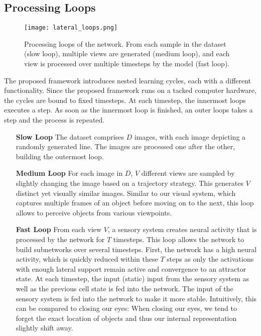 \subsection{Processing Loops}
\begin{figure}[h]
    \centering
    \texttt{[image: lateral\_loops.png]}
    \caption[Processing loops of the network]{Processing loops of the network. From each sample in the dataset (slow loop), multiple views are generated (medium loop), and each view is processed over multiple timesteps by the model (fast loop).}
\end{figure}
The proposed framework introduces nested learning cycles, each with a different functionality. Since the proposed framework runs on a tacked computer hardware, the cycles are bound to fixed timesteps. At each timestep, the innermost loops executes a step. As soon as the innermost loop is finished, an outer loops takes a step and the process is repeated.

\begin{itemize}
\item[\textbf{Slow Loop}] The dataset comprises $D$ images, with each image depicting a randomly generated line. The images are processed one after the other, building the outermost loop.
\item[\textbf{Medium Loop}] For each image in $D$, $V$ different views are sampled by slightly changing the image based on a trajectory strategy. This generates $V$ distinct yet visually similar images. Similar to our visual system, which captures multiple frames of an object before moving on to the next, this loop allows to perceive objects from various viewpoints.
\item[\textbf{Fast Loop}] From each view $V$, a sensory system creates neural activity that is processed by the network for $T$ timesteps. This loop allows the network to build subnetworks over several timesteps. First, the network has a high neural activity, which is quickly reduced within these $T$ steps as only the activations with enough lateral support remain active and convergence to an attractor state. At each timestep, the input (static) input from the sensory system as well as the previous cell state is fed into the network. The input of the sensory system is fed into the network to make it more stable. Intuitively, this can be compared to closing our eyes: When closing our eyes, we tend to forget the exact location of objects and thus our internal representation slightly shift away.
\end{itemize}


